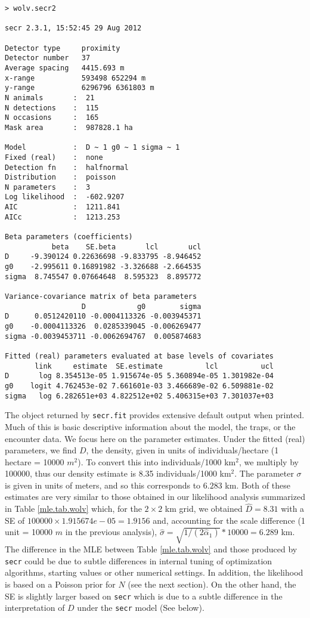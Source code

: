 {\small
\begin{verbatim}
> wolv.secr2

secr 2.3.1, 15:52:45 29 Aug 2012

Detector type     proximity 
Detector number   37 
Average spacing   4415.693 m 
x-range           593498 652294 m 
y-range           6296796 6361803 m 
N animals       :  21  
N detections    :  115 
N occasions     :  165 
Mask area       :  987828.1 ha 

Model           :  D ~ 1 g0 ~ 1 sigma ~ 1 
Fixed (real)    :  none 
Detection fn    :  halfnormal 
Distribution    :  poisson 
N parameters    :  3 
Log likelihood  :  -602.9207 
AIC             :  1211.841 
AICc            :  1213.253 

Beta parameters (coefficients) 
           beta    SE.beta       lcl       ucl
D     -9.390124 0.22636698 -9.833795 -8.946452
g0    -2.995611 0.16891982 -3.326688 -2.664535
sigma  8.745547 0.07664648  8.595323  8.895772

Variance-covariance matrix of beta parameters 
                  D            g0        sigma
D      0.0512420110 -0.0004113326 -0.003945371
g0    -0.0004113326  0.0285339045 -0.006269477
sigma -0.0039453711 -0.0062694767  0.005874683

Fitted (real) parameters evaluated at base levels of covariates 
       link     estimate  SE.estimate          lcl          ucl
D       log 8.354513e-05 1.915674e-05 5.360894e-05 1.301982e-04
g0    logit 4.762453e-02 7.661601e-03 3.466689e-02 6.509881e-02
sigma   log 6.282651e+03 4.822512e+02 5.406315e+03 7.301037e+03
\end{verbatim}
}

The object returned by \mbox{\tt secr.fit} provides extensive default
output when printed. Much of this is basic descriptive information
about the model, the traps, or the encounter data. We focus here on
the parameter estimates.
Under the fitted (real) parameters, we find $D$, the density, given in
units of individuals/hectare (1 hectare = 10000 $m^2$).  To convert this
into individuals/1000 km$^2$, we multiply by 100000, thus our density
estimate is 8.35 individuals/1000 km$^2$.  The parameter $\sigma$ is given in units of
meters, and so this corresponds to
 $6.283$ km.  Both of these estimates are very similar to those
obtained in our likelihood analysis summarized in Table \ref{mle.tab.wolv}
which, for the $2 \times 2$ km grid, we obtained $\hat{D} = 8.31$
with a SE of $100000 \times 
1.915674e-05 = 1.9156$
and, accounting for the scale difference (1 unit = 10000 $m$ in the
previous analysis), $\hat{\sigma} = \sqrt{1/(2\hat{\alpha}_{1})}*10000
= 6.289$ km. 
The difference in the MLE between Table \ref{mle.tab.wolv} and those
produced by \mbox{\tt secr} could be due to subtle differences in  internal
tuning of optimization algorithms, starting values or other numerical
settings. In addition, the likelihood is based on a Poisson prior for
$N$ (see the next section).
On the other hand, the SE is slightly larger based on \mbox{\tt secr}
which is due to a subtle difference in the interpretation of $D$ under
the \mbox{\tt secr} model (See below). 







